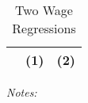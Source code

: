\documentclass{article}
\begin{document}
\begin{table}
    \centering
    \caption{Two Wage Regressions}\label{tab:wage-reg}
    \begin{threeparttable}
    \begin{tabular}{lcc}
        \toprule
         & (1) & (2) \\
        \midrule
        \bottomrule
    \end{tabular}
    \begin{tablenotes}
        \item \emph{Notes:}
    \end{tablenotes}
    \end{threeparttable}
\end{table}
\end{document}
